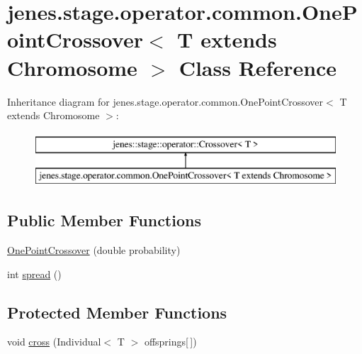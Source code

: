 \hypertarget{classjenes_1_1stage_1_1operator_1_1common_1_1_one_point_crossover_3_01_t_01extends_01_chromosome_01_4}{\section{jenes.\-stage.\-operator.\-common.\-One\-Point\-Crossover$<$ T extends Chromosome $>$ Class Reference}
\label{classjenes_1_1stage_1_1operator_1_1common_1_1_one_point_crossover_3_01_t_01extends_01_chromosome_01_4}
}
Inheritance diagram for jenes.\-stage.\-operator.\-common.\-One\-Point\-Crossover$<$ T extends Chromosome $>$\-:\begin{figure}[H]
\begin{center}
\leavevmode
\includegraphics[height=2.000000cm]{classjenes_1_1stage_1_1operator_1_1common_1_1_one_point_crossover_3_01_t_01extends_01_chromosome_01_4}
\end{center}
\end{figure}
\subsection*{Public Member Functions}
\begin{DoxyCompactItemize}
\item 
\hyperlink{classjenes_1_1stage_1_1operator_1_1common_1_1_one_point_crossover_3_01_t_01extends_01_chromosome_01_4_a441a51f325e76aa282250ecf2c464635}{One\-Point\-Crossover} (double probability)
\item 
int \hyperlink{classjenes_1_1stage_1_1operator_1_1common_1_1_one_point_crossover_3_01_t_01extends_01_chromosome_01_4_a7f29facf7cb0e3baec284ec72730c8c0}{spread} ()
\end{DoxyCompactItemize}
\subsection*{Protected Member Functions}
\begin{DoxyCompactItemize}
\item 
void \hyperlink{classjenes_1_1stage_1_1operator_1_1common_1_1_one_point_crossover_3_01_t_01extends_01_chromosome_01_4_ad8963f25110079a5444d2a0a61d3d1a5}{cross} (Individual$<$ T $>$ offsprings\mbox{[}$\,$\mbox{]})
\end{DoxyCompactItemize}


